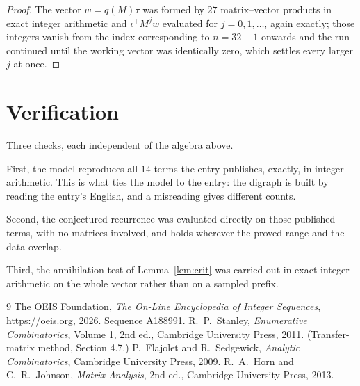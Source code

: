 \documentclass[11pt,a4paper]{article}
\theoremstyle{plain}
\theoremstyle{definition}
\begin{document}
\begin{proof}
The vector $w=q(M)\tau$ was formed by $27$ matrix--vector products in exact integer
arithmetic and $\iota^{\!\top}M^{j}w$ evaluated for $j=0,1,\dots$, again exactly; those
integers vanish from the index corresponding to $n=32+1$ onwards and the run continued
until the working vector was identically zero, which settles every larger $j$ at once.
\end{proof}

\section{Verification}

Three checks, each independent of the algebra above.

First, the model reproduces all $14$ terms the entry publishes, exactly, in integer
arithmetic. This is what ties the model to the entry: the digraph is built by reading the
entry's English, and a misreading gives different counts.

Second, the conjectured recurrence was evaluated directly on those published terms, with no
matrices involved, and holds wherever the proved range and the data overlap.

Third, the annihilation test of Lemma~\ref{lem:crit} was carried out in exact integer
arithmetic on the whole vector rather than on a sampled prefix.

\begin{thebibliography}{9}
 The OEIS Foundation, \emph{The On-Line Encyclopedia of Integer
Sequences}, \url{https://oeis.org}, 2026. Sequence A188991.
 R.~P.~Stanley, \emph{Enumerative Combinatorics}, Volume 1, 2nd ed.,
Cambridge University Press, 2011. (Transfer-matrix method, Section 4.7.)
 P.~Flajolet and R.~Sedgewick, \emph{Analytic Combinatorics}, Cambridge
University Press, 2009.
 R.~A.~Horn and C.~R.~Johnson, \emph{Matrix Analysis}, 2nd ed., Cambridge
University Press, 2013.
\end{thebibliography}
\end{document}
